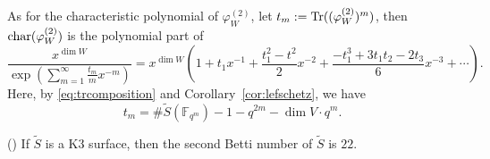 \documentclass[main]{subfiles}
\begin{document}
As for the characteristic polynomial of $\varphi^{(2)}_{W}$, let $t_{m} := \operatorname{Tr}((\varphi^{(2)}_{W})^{m})$, then $\operatorname{char} (\varphi^{(2)}_{W})$ is the polynomial part of
\begin{equation*}
    \frac{x^{\dim W}}{\exp \left( \sum_{m = 1}^{\infty} \frac{t_{m}}{m} x^{-m} \right)} = x^{\dim W} \left( 1 + t_{1} x^{-1} + \frac{t_{1}^{2} - t^{2}}{2} x^{-2} + \frac{-t_{1}^{3} + 3 t_{1} t_{2} - 2 t_{3}}{6} x^{-3} + \cdots \right).
\end{equation*}
Here, by \eqref{eq:trcomposition} and Corollary~\ref{cor:lefschetz}, we have
\begin{equation*}
    t_{m} = \# \tilde{S}(\mathbb{F}_{q^{m}}) - 1 - q^{2m} - \dim V \cdot q^{m}.
\end{equation*}

\begin{lem}{(\cite[Theorem 4, Part III]{ref:mumford2004})}
    \label{lem:k3-betti}
    If $\tilde{S}$ is a K3 surface, then the second Betti number of $\tilde{S}$ is $22$.
\end{lem}
\end{document}

